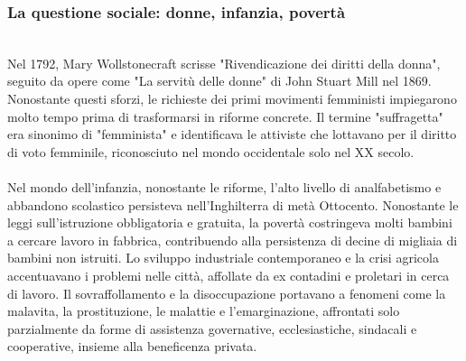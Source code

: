 \documentclass{report}
\begin{document}
\subsubsection{La questione sociale: donne, infanzia, povertà}
\\
Nel 1792, Mary Wollstonecraft scrisse "Rivendicazione dei diritti della donna", seguito da opere come "La servitù delle donne" di John Stuart Mill nel 1869. Nonostante questi sforzi, le richieste dei primi movimenti femministi impiegarono molto tempo prima di trasformarsi in riforme concrete. Il termine "suffragetta" era sinonimo di "femminista" e identificava le attiviste che lottavano per il diritto di voto femminile, riconosciuto nel mondo occidentale solo nel XX secolo.
\\
\\
Nel mondo dell'infanzia, nonostante le riforme, l'alto livello di analfabetismo e abbandono scolastico persisteva nell'Inghilterra di metà Ottocento. Nonostante le leggi sull'istruzione obbligatoria e gratuita, la povertà costringeva molti bambini a cercare lavoro in fabbrica, contribuendo alla persistenza di decine di migliaia di bambini non istruiti. Lo sviluppo industriale contemporaneo e la crisi agricola accentuavano i problemi nelle città, affollate da ex contadini e proletari in cerca di lavoro. Il sovraffollamento e la disoccupazione portavano a fenomeni come la malavita, la prostituzione, le malattie e l'emarginazione, affrontati solo parzialmente da forme di assistenza governative, ecclesiastiche, sindacali e cooperative, insieme alla beneficenza privata.
\\
\\
\\
\\
\end{document}
